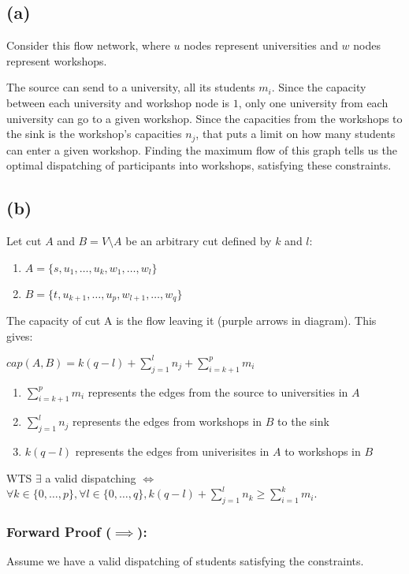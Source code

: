 \subsection*{(a)}

Consider this flow network, where $u$ nodes represent universities and $w$ nodes represent workshops.

The source can send to a university, all its students $m_i$. Since the capacity between each university and workshop node is $1$, only one university from each university can go to a given workshop. Since the capacities from the workshops to the sink is the workshop's capacities $n_j$, that puts a limit on how many students can enter a given workshop. Finding the maximum flow of this graph tells us the optimal dispatching of participants into workshops, satisfying these constraints.

\subsection*{(b)}

Let cut $A$ and $B = V \setminus A$ be an arbitrary cut defined by $k$ and $l$:
\begin{enumerate}
    \item $A = \{s, u_1, \dots, u_k, w_1, \dots, w_l\}$
    \item $B = \{t, u_{k+1}, \dots, u_p, w_{l+1}, \dots, w_q\}$
\end{enumerate}

The capacity of cut A is the flow leaving it (purple arrows in diagram). This gives:

$cap(A,B) = k(q-l) + \sum_{j=1}^{l}n_j + \sum_{i=k+1}^{p} m_i$

\begin{enumerate}
    \item $\sum_{i=k+1}^{p} m_i$ represents the edges from the source to universities in $A$
    \item $\sum_{j=1}^{l}n_j$ represents the edges from workshops in $B$ to the sink
    \item $k(q-l)$ represents the edges from univerisites in $A$ to workshops in $B$
\end{enumerate}

WTS $\exists$ a valid dispatching $\iff$ $\forall k \in \{0, \dots, p\}, \forall l \in \{0, \dots, q\}, k(q-l) + \sum_{j=1}^{l} n_k \geq \sum_{i=1}^{k} m_i$.

\subsubsection*{Forward Proof ($\implies$):}
Assume we have a valid dispatching of students satisfying the constraints.

